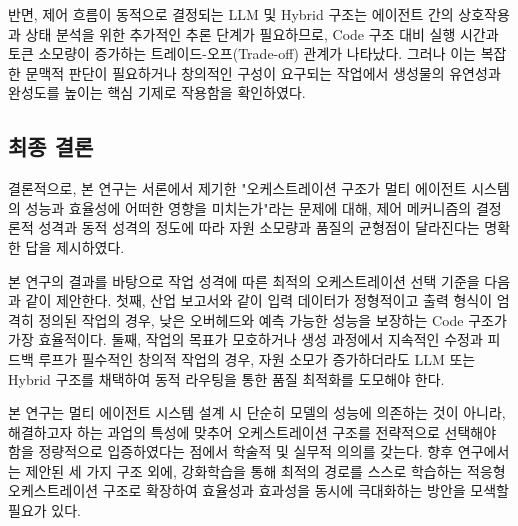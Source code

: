 \documentclass[10pt,twocolumn]{article}
\begin{document}
반면, 제어 흐름이 동적으로 결정되는 LLM 및 Hybrid 구조는 에이전트 간의 상호작용과 상태 분석을 위한 추가적인 추론 단계가 필요하므로, Code 구조 대비 실행 시간과 토큰 소모량이 증가하는 트레이드-오프(Trade-off) 관계가 나타났다. 그러나 이는 복잡한 문맥적 판단이 필요하거나 창의적인 구성이 요구되는 작업에서 생성물의 유연성과 완성도를 높이는 핵심 기제로 작용함을 확인하였다.

\subsection{최종 결론}

결론적으로, 본 연구는 서론에서 제기한 "오케스트레이션 구조가 멀티 에이전트 시스템의 성능과 효율성에 어떠한 영향을 미치는가"라는 문제에 대해, 제어 메커니즘의 결정론적 성격과 동적 성격의 정도에 따라 자원 소모량과 품질의 균형점이 달라진다는 명확한 답을 제시하였다.

본 연구의 결과를 바탕으로 작업 성격에 따른 최적의 오케스트레이션 선택 기준을 다음과 같이 제안한다. 첫째, 산업 보고서와 같이 입력 데이터가 정형적이고 출력 형식이 엄격히 정의된 작업의 경우, 낮은 오버헤드와 예측 가능한 성능을 보장하는 Code 구조가 가장 효율적이다. 둘째, 작업의 목표가 모호하거나 생성 과정에서 지속적인 수정과 피드백 루프가 필수적인 창의적 작업의 경우, 자원 소모가 증가하더라도 LLM 또는 Hybrid 구조를 채택하여 동적 라우팅을 통한 품질 최적화를 도모해야 한다.

본 연구는 멀티 에이전트 시스템 설계 시 단순히 모델의 성능에 의존하는 것이 아니라, 해결하고자 하는 과업의 특성에 맞추어 오케스트레이션 구조를 전략적으로 선택해야 함을 정량적으로 입증하였다는 점에서 학술적 및 실무적 의의를 갖는다. 향후 연구에서는 제안된 세 가지 구조 외에, 강화학습을 통해 최적의 경로를 스스로 학습하는 적응형 오케스트레이션 구조로 확장하여 효율성과 효과성을 동시에 극대화하는 방안을 모색할 필요가 있다.
\end{document}
